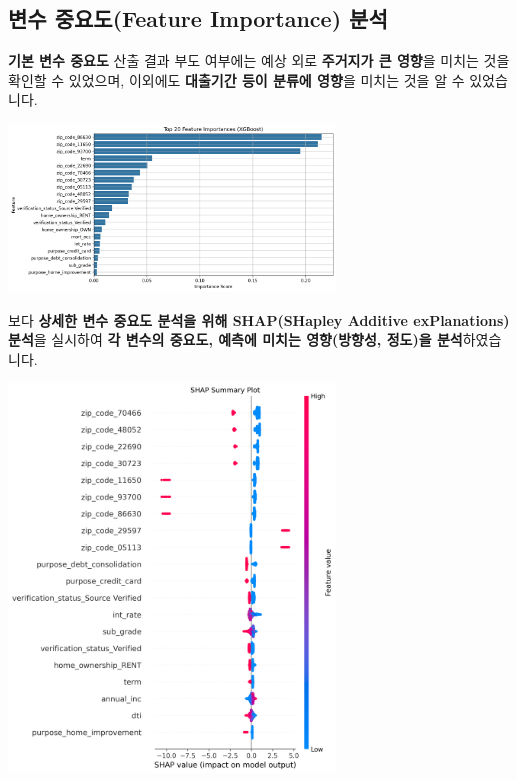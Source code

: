 \documentclass[
  a4paper,
  DIV=11,
  numbers=noendperiod]{scrreprt}
\begin{document}
\newpage

\subsection*{변수 중요도(Feature Importance)
분석}\label{uxbcc0uxc218-uxc911uxc694uxb3c4feature-importance-uxbd84uxc11d}

\textbf{기본 변수 중요도} 산출 결과 부도 여부에는 예상 외로
\textbf{주거지가 큰 영향}을 미치는 것을 확인할 수 있었으며, 이외에도
\textbf{대출기간 등이 분류에 영향}을 미치는 것을 알 수 있었습니다.

\begin{center}
\includegraphics[width=0.65\textwidth,height=\textheight]{plots/feature_importance.png}
\end{center}

보다 \textbf{상세한 변수 중요도 분석을 위해 SHAP(SHapley Additive
exPlanations) 분석}을 실시하여 \textbf{각 변수의 중요도, 예측에 미치는
영향(방향성, 정도)을 분석}하였습니다.

\begin{center}
\includegraphics[width=0.65\textwidth,height=\textheight]{plots/shap_summary_plot.png}
\end{center}
\end{document}
